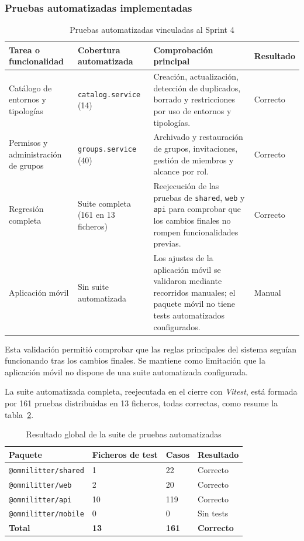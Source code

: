 \subsubsection{Pruebas automatizadas implementadas}

\begin{table}[H]
\centering
\caption{Pruebas automatizadas vinculadas al Sprint 4}
\label{tab:pruebas_automatizadas_sprint4}
\scriptsize
\begin{tabularx}{\textwidth}{p{3.5cm}p{3cm}X p{1.8cm}}
\toprule
Tarea o funcionalidad & Cobertura automatizada & Comprobación principal & Resultado \\
\midrule
Catálogo de entornos y tipologías & \texttt{catalog.service} (14) & Creación, actualización, detección de duplicados, borrado y restricciones por uso de entornos y tipologías. & Correcto \\
Permisos y administración de grupos & \texttt{groups.service} (40) & Archivado y restauración de grupos, invitaciones, gestión de miembros y alcance por rol. & Correcto \\
Regresión completa & Suite completa (161 en 13 ficheros) & Reejecución de las pruebas de \texttt{shared}, \texttt{web} y \texttt{api} para comprobar que los cambios finales no rompen funcionalidades previas. & Correcto \\
Aplicación móvil & Sin suite automatizada & Los ajustes de la aplicación móvil se validaron mediante recorridos manuales; el paquete móvil no tiene tests automatizados configurados. & Manual \\
\bottomrule
\end{tabularx}
\end{table}

Esta validación permitió comprobar que las reglas principales del sistema seguían funcionando tras los cambios finales. Se mantiene como limitación que la aplicación móvil no dispone de una suite automatizada configurada.

La suite automatizada completa, reejecutada en el cierre con \textit{Vitest}, está formada por 161 pruebas distribuidas en 13 ficheros, todas correctas, como resume la tabla~\ref{tab:resultado_global_pruebas}.

\begin{table}[H]
\centering
\caption{Resultado global de la suite de pruebas automatizadas}
\label{tab:resultado_global_pruebas}
\small
\begin{tabularx}{\textwidth}{X p{2.4cm} p{1.8cm} p{2.4cm}}
\toprule
Paquete & Ficheros de test & Casos & Resultado \\
\midrule
\texttt{@omnilitter/shared} & 1 & 22 & Correcto \\
\texttt{@omnilitter/web} & 2 & 20 & Correcto \\
\texttt{@omnilitter/api} & 10 & 119 & Correcto \\
\texttt{@omnilitter/mobile} & 0 & 0 & Sin tests \\
\midrule
\textbf{Total} & \textbf{13} & \textbf{161} & \textbf{Correcto} \\
\bottomrule
\end{tabularx}
\end{table}

